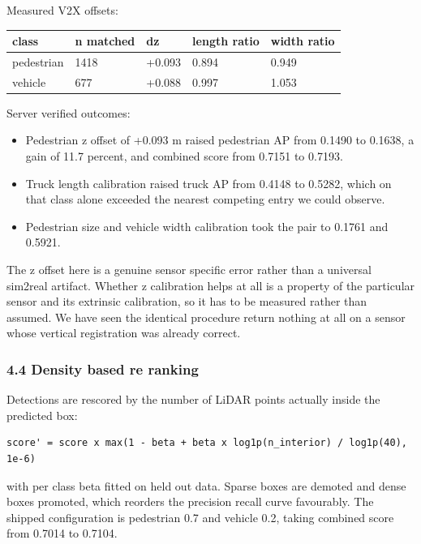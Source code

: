 \documentclass[
  10pt,
]{article}
\newcounter{none} %
\providecommand{\tightlist}{%
  \setlength{\itemsep}{0pt}\setlength{\parskip}{0pt}}
\begin{document}
Measured V2X offsets:

{\def\LTcaptype{none} %
\begin{longtable}[]{@{}lllll@{}}
\toprule\noalign{}
class & n matched & dz & length ratio & width ratio \\
\midrule\noalign{}
\endhead
\bottomrule\noalign{}
\endlastfoot
pedestrian & 1418 & +0.093 & 0.894 & 0.949 \\
vehicle & 677 & +0.088 & 0.997 & 1.053 \\
\end{longtable}
}

Server verified outcomes:

\begin{itemize}
\tightlist
\item
  Pedestrian z offset of +0.093 m raised pedestrian AP from 0.1490 to
  0.1638, a gain of 11.7 percent, and combined score from 0.7151 to
  0.7193.
\item
  Truck length calibration raised truck AP from 0.4148 to 0.5282, which
  on that class alone exceeded the nearest competing entry we could
  observe.
\item
  Pedestrian size and vehicle width calibration took the pair to 0.1761
  and 0.5921.
\end{itemize}

The z offset here is a genuine sensor specific error rather than a
universal sim2real artifact. Whether z calibration helps at all is a
property of the particular sensor and its extrinsic calibration, so it
has to be measured rather than assumed. We have seen the identical
procedure return nothing at all on a sensor whose vertical registration
was already correct.

\subsubsection{4.4 Density based re
ranking}\label{density-based-re-ranking}

Detections are rescored by the number of LiDAR points actually inside
the predicted box:

\begin{verbatim}
score' = score x max(1 - beta + beta x log1p(n_interior) / log1p(40), 1e-6)
\end{verbatim}

with per class beta fitted on held out data. Sparse boxes are demoted
and dense boxes promoted, which reorders the precision recall curve
favourably. The shipped configuration is pedestrian 0.7 and vehicle 0.2,
taking combined score from 0.7014 to 0.7104.
\end{document}
